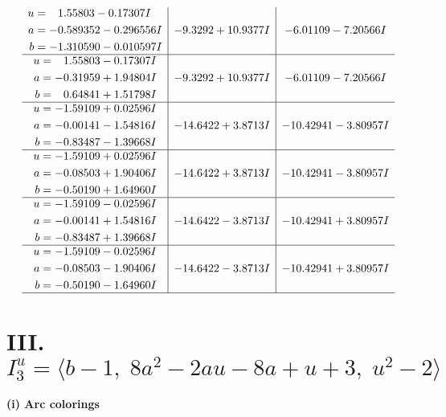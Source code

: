 \documentclass[1p]{elsarticle_modified}
\theoremstyle{definition}
\begin{document}
$$\begin{array}{c|c|c}
\begin{aligned}
u &= \phantom{-}1.55803 - 0.17307 I \\
a &= -0.589352 - 0.296556 I \\
b &= -1.310590 - 0.010597 I\end{aligned}
 & -9.3292 + 10.9377 I & -6.01109 - 7.20566 I \\ \hline\begin{aligned}
u &= \phantom{-}1.55803 - 0.17307 I \\
a &= -0.31959 + 1.94804 I \\
b &= \phantom{-}0.64841 + 1.51798 I\end{aligned}
 & -9.3292 + 10.9377 I & -6.01109 - 7.20566 I \\ \hline\begin{aligned}
u &= -1.59109 + 0.02596 I \\
a &= -0.00141 - 1.54816 I \\
b &= -0.83487 - 1.39668 I\end{aligned}
 & -14.6422 + 3.8713 I & -10.42941 - 3.80957 I \\ \hline\begin{aligned}
u &= -1.59109 + 0.02596 I \\
a &= -0.08503 + 1.90406 I \\
b &= -0.50190 + 1.64960 I\end{aligned}
 & -14.6422 + 3.8713 I & -10.42941 - 3.80957 I \\ \hline\begin{aligned}
u &= -1.59109 - 0.02596 I \\
a &= -0.00141 + 1.54816 I \\
b &= -0.83487 + 1.39668 I\end{aligned}
 & -14.6422 - 3.8713 I & -10.42941 + 3.80957 I \\ \hline\begin{aligned}
u &= -1.59109 - 0.02596 I \\
a &= -0.08503 - 1.90406 I \\
b &= -0.50190 - 1.64960 I\end{aligned}
 & -14.6422 - 3.8713 I & -10.42941 + 3.80957 I\\
 \hline 
 \end{array}$$\newpage\newpage\renewcommand{\arraystretch}{1}
\centering \section*{III. $I^u_{3}= \langle b-1,\;8 a^2-2 a u-8 a+u+3,\;u^2-2 \rangle$}
\flushleft \textbf{(i) Arc colorings}\\
\end{document}
